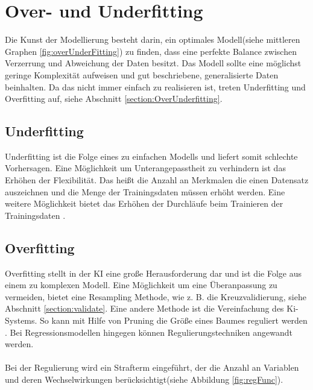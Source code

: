 \documentclass[12pt,oneside,a4paper,parskip]{scrbook}
\begin{document}
\section{Over- und Underfitting}
\label{section:preventData}
Die Kunst der Modellierung besteht darin, ein optimales Modell(siehe mittleren Graphen \ref{fig:overUnderFitting}) zu finden, dass eine perfekte Balance zwischen Verzerrung und Abweichung der Daten besitzt. Das Modell sollte eine möglichst geringe Komplexität aufweisen und gut beschriebene, generalisierte Daten beinhalten. Da das nicht immer einfach zu realisieren ist, treten Underfitting und Overfitting auf, siehe Abschnitt \ref{section:OverUnderfitting}.

\subsection{Underfitting}
Underfitting ist die Folge eines zu einfachen Modells und liefert somit schlechte Vorhersagen. Eine Möglichkeit um Unterangepasstheit zu verhindern ist das Erhöhen der Flexibilität. Das heißt die Anzahl an Merkmalen die einen Datensatz auszeichnen und die Menge der Trainingsdaten müssen erhöht werden. Eine weitere Möglichkeit bietet das Erhöhen der Durchläufe beim Trainieren der Trainingsdaten \cite{amazonOverUnderfitting}.

\subsection{Overfitting}
Overfitting stellt in der KI eine große Herausforderung dar und ist die Folge aus einem zu komplexen Modell. Eine Möglichkeit um eine Überanpassung zu vermeiden, bietet eine Resampling Methode, wie z. B. die Kreuzvalidierung, siehe Abschnitt \ref{section:validate}.
Eine andere Methode ist die Vereinfachung des Ki-Systems. So kann mit Hilfe von Pruning die Größe eines Baumes reguliert werden \cite{overUnderfittingNovu}. Bei Regressionsmodellen hingegen können Regulierungstechniken angewandt werden.
\\\\
Bei der Regulierung wird ein Strafterm eingeführt, der die Anzahl an Variablen und deren Wechselwirkungen berücksichtigt(siehe Abbildung \ref{fig:regFunc}).
\end{document}
